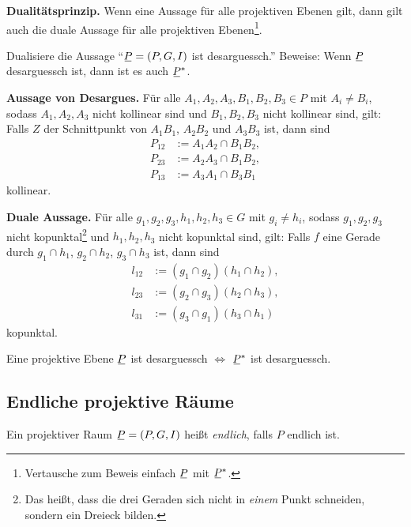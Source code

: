 \textbf{Dualitätsprinzip.} Wenn eine Aussage für alle projektiven Ebenen gilt, dann gilt auch die duale Aussage für alle projektiven Ebenen\footnote{Vertausche zum Beweis einfach $\proj$ mit $\proj^*$.}.

\begin{exmp*}
 Dualisiere die Aussage ``$\proj = (P,G,I)$ ist desarguessch.'' Beweise: Wenn $\proj$ desarguessch ist, dann ist es auch $\proj^*$.
 
 \begin{addmargin}[.5cm]{0cm} 
 \textbf{Aussage von Desargues.} Für alle $A_1, A_2, A_3, B_1, B_2, B_3 \in P$ mit $A_i \ne B_i$, sodass $A_1, A_2, A_3$ nicht kollinear sind und $B_1, B_2, B_3$ nicht kollinear sind, gilt: Falls $Z$ der Schnittpunkt von $A_1 B_1$, $A_2 B_2$ und $A_3 B_3$ ist, dann sind 
 \begin{align*}
  P_{12} &:= A_1 A_2 \cap B_1 B_2, \\
  P_{23} &:= A_2 A_3 \cap B_1 B_2, \\
  P_{13} &:= A_3 A_1 \cap B_3 B_1 
 \end{align*}
 kollinear.
 
 \textbf{Duale Aussage.} Für alle $g_1, g_2, g_3, h_1, h_2, h_3 \in G$ mit $g_i \ne h_i$, sodass $g_1, g_2, g_3$ nicht kopunktal\footnote{Das heißt, dass die drei Geraden sich nicht in \emph{einem} Punkt schneiden, sondern ein Dreieck bilden.} und $h_1, h_2, h_3$ nicht kopunktal sind, gilt: Falls $f$ eine Gerade durch $g_1 \cap h_1$, $g_2 \cap h_2$, $g_3 \cap h_3$ ist, dann sind
 \begin{align*}
  l_{12} &:= (g_1 \cap g_2)(h_1 \cap h_2), \\
  l_{23} &:= (g_2 \cap g_3)(h_2 \cap h_3), \\
  l_{31} &:= (g_3 \cap g_1)(h_3 \cap h_1 )
 \end{align*}
 kopunktal.
 \end{addmargin}
\end{exmp*}

\setcounter{thm}{5}
\begin{thm}
 Eine projektive Ebene $\proj$ ist desarguessch $\Leftrightarrow$ $\proj^*$ ist desarguessch.
\end{thm}

\subsection{Endliche projektive Räume}

\begin{defn*}
 Ein projektiver Raum $\proj = (P,G,I)$ heißt \emph{endlich}, falls $P$ endlich ist.
\end{defn*}

